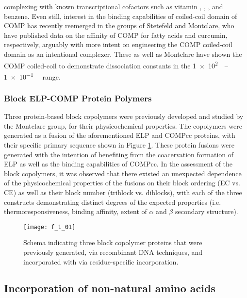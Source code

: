 \begin{refsection}
complexing with known transcriptional cofactors such as vitamin ,
, , and
benzene.\cite{Guo1998,Ozbek2002} Even still, interest in the binding
capabilities of coiled-coil domain of COMP has recently reemerged in the groups
of Stetefeld and Montclare, who have published data on the affinity of COMP for
fatty acids and curcumin, respectively, arguably with more intent on engineering
the COMP coiled-coil domain as an intentional
complexer.\cite{McFarlane2012,Gunasekar2009} These as well as Montclare
have shown the COMP coiled-coil to demonstrate dissociation constants in
the
\SIrange[scientific-notation=true,retain-unity-mantissa=false]{1e2}{1e-1}{\micro\moLar}
range.\cite{Haghpanah2010,Guo1998}

\subsubsection{Block ELP-COMP Protein Polymers}

Three protein-based block copolymers were previously developed and studied by
the Montclare group,\cite{Haghpanah2010,Haghpanah2009} for their physicochemical
properties. The copolymers were generated as a fusion of the aforementioned ELP
and COMPcc proteins, with their specific primary sequence shown in Figure
\ref{fig:pff_proteins}. These protein fusions were generated with the intention
of benefiting from the coacervation formation of ELP as well as the binding
capabilities of COMPcc. In the assessment of the block copolymers, it was
observed that there existed an unexpected dependence of the physicochemical
properties of the fusions on their block ordering (EC vs. CE) as well as their
block number (triblock vs. diblocks), with each of the three constructs
demonstrating distinct degrees of the expected properties (i.e.
thermoresponsiveness, binding affinity, extent of ${\alpha}$ and ${\beta}$
secondary structure).
\begin{figure}[h!]
    \centering
    \texttt{[image: f\_1\_01]}
    \caption{Schema indicating three block copolymer proteins that were
        previously generated, via recombinant DNA techniques, and incorporated
        with  via residue-specific incorporation.
    }
    \label{fig:pff_proteins}
\end{figure}
\subsection{Incorporation of non-natural amino acids}


\end{refsection}
